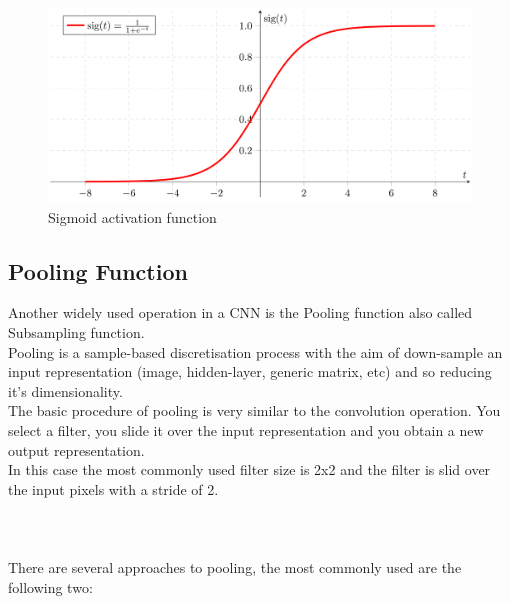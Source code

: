 \documentclass[a4paper]{report}
\begin{document}
\begin{figure}[h]
\centering
\includegraphics[width=0.8\columnwidth]{docs/sigmoid.png} 
\caption{Sigmoid activation function}
\label{fig_sigmoid}
\end{figure}
 

\subsection{Pooling Function}
Another widely used operation in a CNN is the Pooling function also called Subsampling function.\\
Pooling is a sample-based discretisation process with the aim of down-sample an input representation (image, hidden-layer, generic matrix, etc) and so reducing it's dimensionality.\\
The basic procedure of pooling is very similar to the convolution operation. You select a filter, you slide it over the input representation and you obtain a new output representation.\\
In this case the most commonly used filter size is 2x2 and the filter is slid over the input pixels with a stride of 2.\\\\\\\\
There are several approaches to pooling, the most commonly used are the following two:
\end{document}

